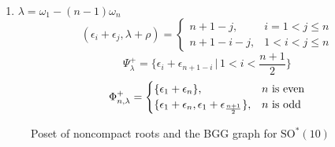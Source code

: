 \begin{enumerate}
 \item $\lambda = \omega_1 -(n-1)\omega_n $\\
 \[
  (\epsilon_i + \epsilon_j,\lambda+\rho) = \begin{cases}
                                            n+1-j, & i=1<j\leq n\\
                                            n+1-i-j, & 1<i<j\leq n
                                           \end{cases}
 \]
 \[
   \Psi^+_\lambda = \Big\{\epsilon_i + \epsilon_{n+1-i} \,\big|\, 1 < i < \frac{n+1}{2} \Big\}
 \]
 \[
   \Phi^+_{n,\lambda} = \begin{cases}
				\{\epsilon_1 + \epsilon_n \}, & n \text{ is even} \\
				\{\epsilon_1 + \epsilon_n, \epsilon_1 + \epsilon_{\frac{n+1}{2}} \}, & n \text{ is odd}
			  \end{cases}
  \]
\end{enumerate}

\begin{figure}[H]
  \centering
   
	 
  \caption{Poset of noncompact roots and the BGG graph for $\mathrm{SO}^*(10)$}
\end{figure} 
